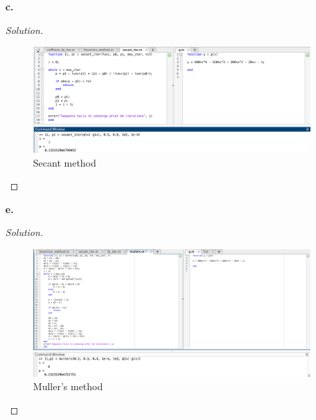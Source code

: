 \documentclass{article}
\begin{document}
\begin{enumerate}
\begin{proof}[Solution]
\begin{figure}[htb!]
            \caption{Newton's method}
        \end{figure}
    \end{proof}
    \newpage
    \item[\textbf{c.}]
    \begin{proof}[Solution]\indent
        \begin{figure}[htb!]
            \centering
            \includegraphics[scale=0.35]{2.6.7c.png}
            \caption{Secant method}
        \end{figure}
    \end{proof}

    \item[\textbf{e.}]
    \begin{proof}[Solution]\indent
        \begin{figure}[htb!]
            \centering
            \includegraphics[scale=0.35]{2.6.7e.png}
            \caption{Muller's method}
        \end{figure}
    \end{proof}
    
\end{enumerate}

\newpage
\end{document}
